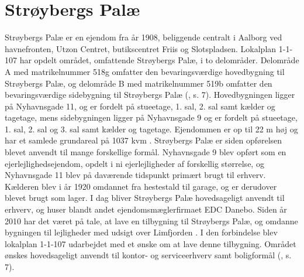 \section{Strøybergs Palæ}
Strøybergs Palæ er en ejendom fra år 1908, beliggende centralt i Aalborg ved havnefronten, Utzon Centret, butikscentret Friis og Slotspladsen.
\newline \indent{     }  Lokalplan 1-1-107 har opdelt området, omfattende Strøybergs Palæ, i to delområder. Delområde A med matrikelnummer 518g omfatter den bevaringsværdige hovedbygning til Strøybergs Palæ, og delområde B med matrikelnummer 519b omfatter den bevaringsværdige sidebygning til Strøybergs Palæ (\citep{lokalplan}, s. 7). Hovedbygningen ligger på Nyhavnsgade 11, og er fordelt på stueetage, 1. sal, 2. sal samt kælder og tagetage, mens sidebygningen ligger på Nyhavnsgade 9 og er fordelt på stueetage, 1. sal, 2. sal og 3. sal samt kælder og tagetage. Ejendommen er op til 22 m høj og har et samlede grundareal på 1037 kvm \citep{byggesagen}.
\newline 
\newline 
Strøybergs Palæ er siden opførelsen blevet anvendt til mange forskellige formål. 
\newline \indent{     }  Nyhavnsgade 9 blev opført som en ejerlejlighedsejendom, opdelt i ni ejerlejligheder af forskellig størrelse, og Nyhavnsgade 11 blev på daværende tidspunkt primært brugt til erhverv. 
\newline \indent{     }  Kælderen blev i år 1920 omdannet fra hestestald til garage, og er derudover blevet brugt som lager.
\newline \indent{     }  I dag bliver Strøybergs Palæ hovedsageligt anvendt til erhverv, og huser blandt andet ejendomsmæglerfirmaet EDC Danebo.
\newline \indent{     }  Siden år 2010 har det været på tale, at lave en tilbygning til Strøybergs Palæ, og omdanne bygningen til lejligheder med udsigt over Limfjorden \citep{link}. I den forbindelse blev lokalplan 1-1-107 udarbejdet med et ønske om at lave denne tilbygning. Området ønskes hovedsageligt anvendt til kontor- og serviceerhverv samt boligformål (\citep{lokalplan}, s. 7).